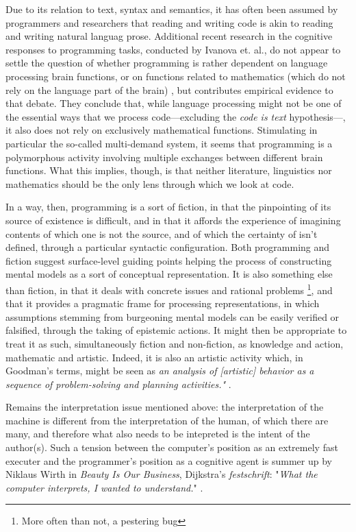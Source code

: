Due to its relation to text, syntax and semantics, it has often been assumed by programmers and researchers that reading and writing code is akin to reading and writing natural languag prose. Additional recent research in the cognitive responses to programming tasks, conducted by Ivanova et. al., do not appear to settle the question of whether programming is rather dependent on language processing brain functions, or on functions related to mathematics (which do not rely on the language part of the brain) \citep{ivanova_comprehension_2020}, but contributes empirical evidence to that debate. They conclude that, while language processing might not be one of the essential ways that we process code—excluding the \emph{code is text} hypothesis—, it also does not rely on exclusively mathematical functions. Stimulating in particular the so-called multi-demand system, it seems that programming is a polymorphous activity involving multiple exchanges between different brain functions. What this implies, though, is that neither literature, linguistics nor mathematics should be the only lens through which we look at code.

In a way, then, programming is a sort of fiction, in that the pinpointing of its source of existence is difficult, and in that it affords the experience of imagining contents of which one is not the source, and of which the certainty of isn't defined, through a particular syntactic configuration. Both programming and fiction suggest surface-level guiding points helping the process of constructing mental models as a sort of conceptual representation. It is also something else than fiction, in that it deals with concrete issues and rational problems \footnote{More often than not, a pestering bug}, and that it provides a pragmatic frame for processing representations, in which assumptions stemming from burgeoning mental models can be easily verified or falsified, through the taking of epistemic actions. It might then be appropriate to treat it as such, simultaneously fiction and non-fiction, as knowledge and action, mathematic and artistic. Indeed, it is also an artistic activity which, in Goodman's terms, might be seen as \emph{an analysis of [artistic] behavior as a sequence of problem-solving and planning activities."} \citep{goodman_basic_1972}.

Remains the interpretation issue mentioned above: the interpretation of the machine is different from the interpretation of the human, of which there are many, and therefore what also needs to be intepreted is the intent of the author(s). Such a tension between the computer's position as an extremely fast executer and the programmer's position as a cognitive agent is summer up by Niklaus Wirth in \emph{Beauty Is Our Business}, Dijkstra's \emph{festschrift}: "\emph{What the computer interprets, I wanted to understand.}" \citep{wirth_drawing_1990}.

